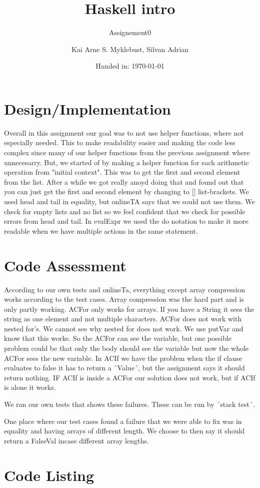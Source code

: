 \documentclass[12pt,a4paper]{article}
\begin{document}
\title{Haskell intro}
\subtitle{Assignement0}

\author{Kai Arne S. Myklebust, Silvan Adrian}
\date{Handed in: \today}
	
\maketitle
\tableofcontents

\section{Design/Implementation}

Overall in this assignment our goal was to not use helper functions, where not especially needed. This to make readability easier and making the code less complex since many of our helper functions from the previous assignment where unnecesarry.
But, we started of by making a helper function for each arithmetic operation from "initial context". This was to get the first and second element from the list. After a while we got really anoyd doing that and found out that you can just get the first and second element by changing to [] list-brackets.
We used head and tail in equality, but onlineTA says that we sould not use them. We check for empty lists and no list so we feel confident that we check for possible errors from head and tail.
In evalExpr we used the do notation to make it more readable when we have multiple actions in the same statement. 

\section{Code Assessment}
According to our own tests and onlineTa, everything except array compression works according to the test cases.
Array compression was the hard part and is only partly working. ACFor only works for arrays. If you have a String it sees the string as one element and not multiple characters. ACFor does not work with nested for's. We cannot see why nested for does not work. We use putVar and know that this works. So the ACFor can see the variable, but one possible problem could be that only the body should see the variable but now the whole ACFor sees the new variable.
In ACIf we have the problem when the if clause evaluates to false it has to return a ´Value´, but the assignment says it should return nothing. IF ACIf is inside a ACFor our solution does not work, but if ACIf is alone it works.

We ran our own tests that shows these failures. These can be run by ´stack test´. 

One place where our test cases found a failure that we were able to fix was in equality and having arrays of different length. We choose to then say it should return a FalseVal incase different array lengths.

\appendix
\section{Code Listing}

\inputminted{haskell}{assignement1/src/SubsInterpreter.hs}
\end{document}
